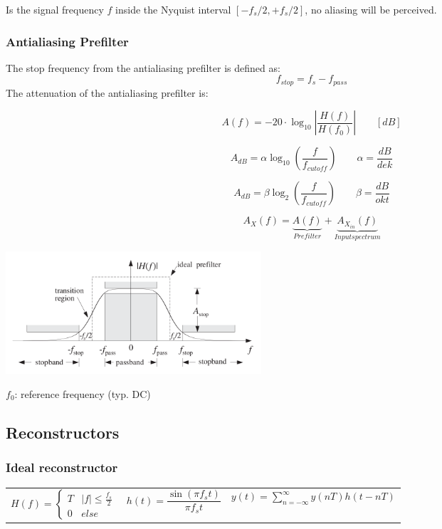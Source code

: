Is the signal frequency $f$ inside the Nyquist interval $\left[-f_s/2,+f_s/2\right]$, no aliasing will be
perceived.

\subsubsection{Antialiasing Prefilter }
The stop frequency from the antialiasing prefilter is defined as:
\[ f_{stop} = f_s - f_{pass} \]
The attenuation of the antialiasing prefilter is:
\begin{multicols}{2}

\[ A(f) = -20 \cdot \log_{10}{\left|\frac{H(f)}{H(f_0)}\right|} \qquad [dB] \]

\[ A_{dB} = \alpha \log_{10}(\frac{f}{f_{cutoff}}) \qquad \alpha = \frac{dB}{dek} \]

\[ A_{dB} = \beta \log_{2}(\frac{f}{f_{cutoff}}) \qquad \beta = \frac{dB}{okt} \]

\[ A_{X}(f) = \underbrace{A(f)}_{Prefilter} + \underbrace{A_{X_{in}}(f)}_{Input spectrum} \]

\columnbreak

 \includegraphics[width=9.5cm]{./picture/antialiasing_prefilter}

\end{multicols}

$f_0$: reference frequency (typ. DC)

\subsection{Reconstructors }
\subsubsection{Ideal reconstructor }
  \begin{tabular}{p{5cm}p{4cm}p{6cm}}
	  $H(f) = \left\lbrace \begin{matrix}
	    T & |f| \leq \frac{f_s}{2} \\
	    0 & else
	  \end{matrix}\right.$ & 
    $h(t) = \dfrac{\sin(\pi f_s t)}{\pi f_s t}$ &
    $y(t) = \sum\limits_{n=-\infty}^\infty y(nT)h(t-nT)$
  \end{tabular}
  

